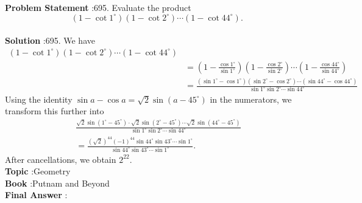 \documentclass[10pt]{article}
\begin{document}
\textbf{Problem Statement} :695. Evaluate the product$$ \left(1-\cot 1^{\circ}\right)\left(1-\cot 2^{\circ}\right) \cdots\left(1-\cot 44^{\circ}\right) \text {. } $$\\
\textbf{Solution} :695. We have$$ \begin{aligned} \left(1-\cot 1^{\circ}\right)\left(1-\cot 2^{\circ}\right) \cdots\left(1-\cot 44^{\circ}\right) \\ &=\left(1-\frac{\cos 1^{\circ}}{\sin 1^{\circ}}\right)\left(1-\frac{\cos 2^{\circ}}{\sin 2^{\circ}}\right) \cdots\left(1-\frac{\cos 44^{\circ}}{\sin 44^{\circ}}\right) \\ &=\frac{\left(\sin 1^{\circ}-\cos 1^{\circ}\right)\left(\sin 2^{\circ}-\cos 2^{\circ}\right) \cdots\left(\sin 44^{\circ}-\cos 44^{\circ}\right)}{\sin 1^{\circ} \sin 2^{\circ} \cdots \sin 44^{\circ}} \end{aligned} $$Using the identity $\sin a-\cos a=\sqrt{2} \sin \left(a-45^{\circ}\right)$ in the numerators, we transform this further into$$ \begin{gathered} \frac{\sqrt{2} \sin \left(1^{\circ}-45^{\circ}\right) \cdot \sqrt{2} \sin \left(2^{\circ}-45^{\circ}\right) \cdots \sqrt{2} \sin \left(44^{\circ}-45^{\circ}\right)}{\sin 1^{\circ} \sin 2^{\circ} \cdots \sin 44^{\circ}} \\ =\frac{(\sqrt{2})^{44}(-1)^{44} \sin 44^{\circ} \sin 43^{\circ} \cdots \sin 1^{\circ}}{\sin 44^{\circ} \sin 43^{\circ} \cdots \sin 1^{\circ}} . \end{gathered} $$After cancellations, we obtain $2^{22}$.\\
\textbf{Topic} :Geometry\\
\textbf{Book} :Putnam and Beyond\\
\textbf{Final Answer} :\\
\end{document}
